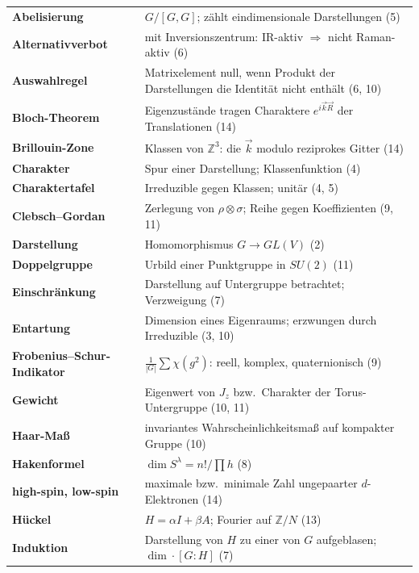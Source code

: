 \begin{merksatz}
\begin{center}
{\small
\renewcommand{\arraystretch}{1.42}
\begin{tabular}{@{}P{3.4cm}P{5.2cm}@{}}
\toprule
\textbf{Abelisierung} & $G/[G, G]$; zählt eindimensionale Darstellungen (5)\\
\textbf{Alternativverbot} & mit Inversionszentrum: IR-aktiv $\Rightarrow$ nicht Raman-aktiv (6)\\
\textbf{Auswahlregel} & Matrixelement null, wenn Produkt der Darstellungen die Identität nicht enthält (6, 10)\\
\textbf{Bloch-Theorem} & Eigenzustände tragen Charaktere $e^{i\vec k\vec R}$ der Translationen (14)\\
\textbf{Brillouin-Zone} & Klassen von $\mathbb Z^{3}$: die $\vec k$ modulo reziprokes Gitter (14)\\
\textbf{Charakter} & Spur einer Darstellung; Klassenfunktion (4)\\
\textbf{Charaktertafel} & Irreduzible gegen Klassen; unitär (4, 5)\\
\textbf{Clebsch--Gordan} & Zerlegung von $\rho\otimes\sigma$; Reihe gegen Koeffizienten (9, 11)\\
\textbf{Darstellung} & Homomorphismus $G\to GL(V)$ (2)\\
\textbf{Doppelgruppe} & Urbild einer Punktgruppe in $SU(2)$ (11)\\
\textbf{Einschränkung} & Darstellung auf Untergruppe betrachtet; Verzweigung (7)\\
\textbf{Entartung} & Dimension eines Eigenraums; erzwungen durch Irreduzible (3, 10)\\
\textbf{Frobenius--Schur-Indi\-kator} & $\frac1{|G|}\sum\chi(g^{2})$: reell, komplex, quaternionisch (9)\\
\textbf{Gewicht} & Eigenwert von $J_z$ bzw.\ Charakter der Torus-Untergruppe (10, 11)\\
\textbf{Haar-Maß} & invariantes Wahrscheinlichkeitsmaß auf kompakter Gruppe (10)\\
\textbf{Hakenformel} & $\dim S^{\lambda} = n!/\prod h$ (8)\\
\textbf{high-spin, low-spin} & maximale bzw.\ minimale Zahl ungepaarter $d$-Elektronen (14)\\
\textbf{Hückel} & $H = \alpha I + \beta A$; Fourier auf $\mathbb Z/N$ (13)\\
\textbf{Induktion} & Darstellung von $H$ zu einer von $G$ aufgeblasen; $\dim\cdot[G\colon H]$ (7)\\

\end{tabular}}
\end{center}
\end{merksatz}
